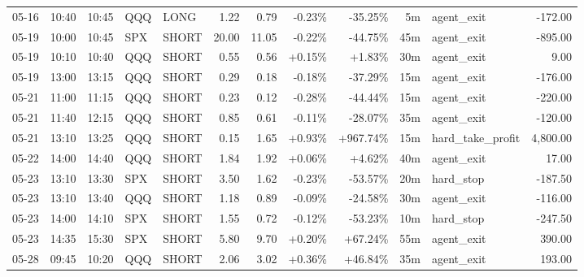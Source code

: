 \documentclass[11pt,a4paper,twoside]{article}
\begin{document}
\begin{center}
\begin{longtable}{>{\color{txtmain}}l l l l l r r r r r >{\color{txtmain}}l r}
05-16 & 10:40 & 10:45 & QQQ & LONG & 1.22 & 0.79 & \textcolor{lossred}{-0.23\%} & \textcolor{lossred}{-35.25\%} & 5m & agent\_exit & \textcolor{lossred}{-172.00} \\
05-19 & 10:00 & 10:45 & SPX & SHORT & 20.00 & 11.05 & \textcolor{lossred}{-0.22\%} & \textcolor{lossred}{-44.75\%} & 45m & agent\_exit & \textcolor{lossred}{-895.00} \\
05-19 & 10:10 & 10:40 & QQQ & SHORT & 0.55 & 0.56 & \textcolor{wingreen}{+0.15\%} & \textcolor{wingreen}{+1.83\%} & 30m & agent\_exit & \textcolor{wingreen}{9.00} \\
05-19 & 13:00 & 13:15 & QQQ & SHORT & 0.29 & 0.18 & \textcolor{lossred}{-0.18\%} & \textcolor{lossred}{-37.29\%} & 15m & agent\_exit & \textcolor{lossred}{-176.00} \\
05-21 & 11:00 & 11:15 & QQQ & SHORT & 0.23 & 0.12 & \textcolor{lossred}{-0.28\%} & \textcolor{lossred}{-44.44\%} & 15m & agent\_exit & \textcolor{lossred}{-220.00} \\
05-21 & 11:40 & 12:15 & QQQ & SHORT & 0.85 & 0.61 & \textcolor{lossred}{-0.11\%} & \textcolor{lossred}{-28.07\%} & 35m & agent\_exit & \textcolor{lossred}{-120.00} \\
05-21 & 13:10 & 13:25 & QQQ & SHORT & 0.15 & 1.65 & \textcolor{wingreen}{+0.93\%} & \textcolor{wingreen}{+967.74\%} & 15m & hard\_take\_profit & \textcolor{wingreen}{4,800.00} \\
05-22 & 14:00 & 14:40 & QQQ & SHORT & 1.84 & 1.92 & \textcolor{wingreen}{+0.06\%} & \textcolor{wingreen}{+4.62\%} & 40m & agent\_exit & \textcolor{wingreen}{17.00} \\
05-23 & 13:10 & 13:30 & SPX & SHORT & 3.50 & 1.62 & \textcolor{lossred}{-0.23\%} & \textcolor{lossred}{-53.57\%} & 20m & hard\_stop & \textcolor{lossred}{-187.50} \\
05-23 & 13:10 & 13:40 & QQQ & SHORT & 1.18 & 0.89 & \textcolor{lossred}{-0.09\%} & \textcolor{lossred}{-24.58\%} & 30m & agent\_exit & \textcolor{lossred}{-116.00} \\
05-23 & 14:00 & 14:10 & SPX & SHORT & 1.55 & 0.72 & \textcolor{lossred}{-0.12\%} & \textcolor{lossred}{-53.23\%} & 10m & hard\_stop & \textcolor{lossred}{-247.50} \\
05-23 & 14:35 & 15:30 & SPX & SHORT & 5.80 & 9.70 & \textcolor{wingreen}{+0.20\%} & \textcolor{wingreen}{+67.24\%} & 55m & agent\_exit & \textcolor{wingreen}{390.00} \\
05-28 & 09:45 & 10:20 & QQQ & SHORT & 2.06 & 3.02 & \textcolor{wingreen}{+0.36\%} & \textcolor{wingreen}{+46.84\%} & 35m & agent\_exit & \textcolor{wingreen}{193.00} \\

\end{longtable}
\end{center}
\end{document}
